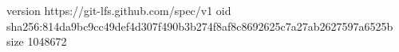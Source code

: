 version https://git-lfs.github.com/spec/v1
oid sha256:814da9bc9cc49def4d307f490b3b274f8af8c8692625c7a27ab2627597a6525b
size 1048672
